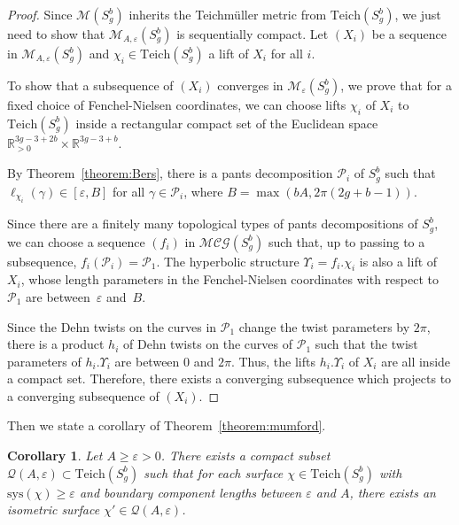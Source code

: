 \documentclass[a4paper,12pt]{article}
\newtheorem{corollaire}[theorem]{Corollary}
\theoremstyle{definition}
\theoremstyle{remark}
\begin{document}
\begin{proof}
    Since $\mathcal{M}(S_g^b)$ inherits the Teichmüller metric from $\mathrm{Teich}(S_g^b)$, we just need to show that $\mathcal{M}_{A, \varepsilon}(S_g^b) $ is sequentially compact. Let $(X_i)$ be a sequence in $\mathcal{M}_{A, \varepsilon}(S_g^b)$ and $\chi_i \in \mathrm{Teich}(S_g^b)$ a lift of $X_i$ for all $i$. 
    
    To show that a subsequence of $(X_i)$ converges in $\mathcal{M}_{\varepsilon}(S_g^b)$, we prove that for a fixed choice of Fenchel-Nielsen coordinates, we can choose lifts $\chi_i$ of $X_i$ to $\mathrm{Teich}(S_g^b)$ inside a rectangular compact set of the Euclidean space $\mathbb{R}_{>0}^{3g-3+2b} \times \mathbb{R}^{3g-3+b}  $. 
    
    By Theorem~\ref{theorem:Bers}, there is a pants decomposition $\mathcal{P}_i$ of $S_g^b$ such that \mbox{$\ell_{\chi_i}(\gamma) \in [\varepsilon, B]$} for all $\gamma \in \mathcal{P}_i$, where $B=\max (bA, 2\pi(2g+b-1))$.
    
    Since there are a finitely many topological types of pants decompositions of $S_g^b$, we can choose a sequence $(f_i)$ in $\mathcal{MCG}(S_g^b)$ such that, up to passing to a subsequence, $f_i(\mathcal{P}_i)=\mathcal{P}_1$. The hyperbolic structure $\Upsilon_i = f_i.\chi_i$ is also a lift of $X_i$, whose length parameters in the Fenchel-Nielsen coordinates with respect to $\mathcal{P}_1$ are between~$\varepsilon$ and~$B$.
    
    Since the Dehn twists on the curves in $\mathcal{P}_1$ change the twist parameters by $2\pi$, there is a product $h_i$ of Dehn twists on the curves of $\mathcal{P}_1$ such that the twist parameters of $h_i.\Upsilon_i$ are between $0$ and $2\pi$. Thus, the lifts $h_i.\Upsilon_i$ of $X_i$ are all inside a compact set. Therefore, there exists a converging subsequence which projects to a converging subsequence of $(X_i)$.
\end{proof}


Then we state a corollary of Theorem~\ref{theorem:mumford}.

\begin{corollaire}\label{cor:mumf}
    Let $A \geqslant \varepsilon >0$. There exists a compact subset $\mathcal{Q}(A, \varepsilon) \subset \mathrm{Teich}(S_g^b)$ such that for each surface $\chi \in \mathrm{Teich}(S_g^b)$ with $\mathrm{sys}(\chi) \geqslant \varepsilon$ and boundary component lengths between $\varepsilon$ and $A$, there exists an isometric surface $\chi' \in \mathcal{Q}(A, \varepsilon)$.
\end{corollaire}
\end{document}
